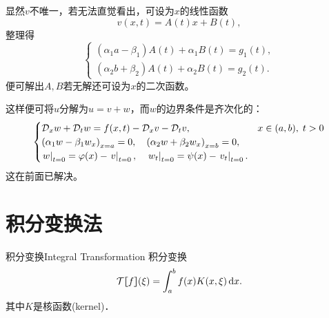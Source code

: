 显然$v$不唯一，若无法直觉看出，可设为$x$的线性函数
\[
	v(x,t)=A(t)x+B(t),
\]
整理得
\[
	\begin{cases}
		(\alpha_1a-\beta_1)A(t)+\alpha_1B(t)=g_1(t),\\
		(\alpha_2b+\beta_2)A(t)+\alpha_2B(t)=g_2(t).
	\end{cases}
\]
便可解出$A,B$若无解还可设为$x$的二次函数。

这样便可将$u$分解为$u=v+w$，而$w$的边界条件是齐次化的：
\begin{align*}
	\begin{cases}
		\mathcal D_xw+\mathcal D_tw=f(x,t)-\mathcal D_xv-\mathcal D_tv,&x\in(a,b),\;t>0\\
		\left(\alpha_1w-\beta_1w_x\right)_{x=a}=0,\quad\left(\alpha_2w+\beta_2w_x\right)_{x=b}=0,\\
		\left.w\right\rvert_{t=0}=\varphi(x)-\left.v\right\rvert_{t=0},\quad\left.w_t\right\rvert_{t=0}=\psi(x)-\left.v_t\right\rvert_{t=0}.
	\end{cases}
\end{align*}
这在前面已解决。
\clearpage
\section{积分变换法}
\begin{definition}{积分变换}{Integral Transformation}
	积分变换
	\[\mathcal T\lfloor\hspace{-4.7 pt}\lceil f\rceil\hspace{-4.7 pt}\rfloor(\xi)=\int_a^bf(x)K(x,\xi)\mathop{}\!\mathrm{d} x.\]
	其中$K$是核函数(kernel)．
\end{definition}
